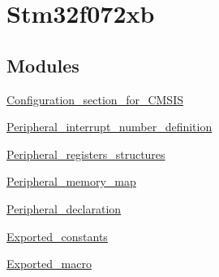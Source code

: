 \hypertarget{group__stm32f072xb}{}\section{Stm32f072xb}
\label{group__stm32f072xb}
\subsection*{Modules}
\begin{DoxyCompactItemize}
\item 
\hyperlink{group___configuration__section__for___c_m_s_i_s}{Configuration\+\_\+section\+\_\+for\+\_\+\+C\+M\+S\+IS}
\item 
\hyperlink{group___peripheral__interrupt__number__definition}{Peripheral\+\_\+interrupt\+\_\+number\+\_\+definition}
\item 
\hyperlink{group___peripheral__registers__structures}{Peripheral\+\_\+registers\+\_\+structures}
\item 
\hyperlink{group___peripheral__memory__map}{Peripheral\+\_\+memory\+\_\+map}
\item 
\hyperlink{group___peripheral__declaration}{Peripheral\+\_\+declaration}
\item 
\hyperlink{group___exported__constants}{Exported\+\_\+constants}
\item 
\hyperlink{group___exported__macro}{Exported\+\_\+macro}
\end{DoxyCompactItemize}
